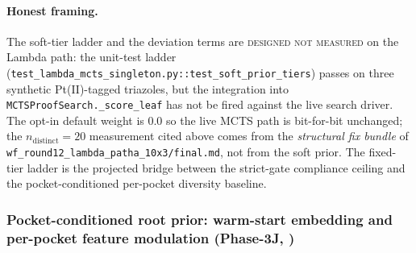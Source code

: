 \paragraph{Honest framing.}
The soft-tier ladder and the deviation terms are \textsc{designed
not measured} on the Lambda path: the unit-test ladder
(\texttt{test\_lambda\_mcts\_singleton.py::test\_soft\_prior\_tiers})
passes on three synthetic Pt(II)-tagged triazoles, but the
integration into \texttt{MCTSProofSearch.\_score\_leaf} has not be
fired against the live search driver.  The opt-in default
weight is $0.0$ so the live MCTS path is bit-for-bit unchanged;
the $n_{\text{distinct}}=20$ measurement cited above comes from
the \emph{structural fix bundle} of \texttt{wf\_round12\_lambda\_patha\_10x3/final.md},
not from the soft prior.  The fixed-tier ladder is the
projected bridge between the strict-gate compliance ceiling and
the pocket-conditioned per-pocket diversity baseline.

\subsubsection{Pocket-conditioned root prior: warm-start embedding
and per-pocket feature modulation (Phase-3J, \DESIGN{})}
\label{sec:mcts-pocket-warm-start}


